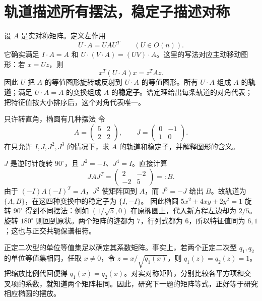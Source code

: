 \section{轨道描述所有摆法，稳定子描述对称}
设 \(A\) 是实对称矩阵。定义左作用
\[
 U\cdot A=UAU^T \qquad (U\in O(n)).
\]
它确实满足 \(I\cdot A=A\) 和 \(U\cdot(V\cdot A)=(UV)\cdot A\)。这里的写法对应主动移动图形：若 \(x=Uz\)，则
\[
 x^T(U\cdot A)x=z^TAz.
\]
因此 \(U\) 把 \(A\) 的等值图形旋转或反射到 \(U\cdot A\) 的等值图形。所有 \(U\cdot A\) 组成 \(A\) 的\textbf{轨道}；满足 \(U\cdot A=A\) 的变换组成 \(A\) 的\textbf{稳定子}。谱定理给出每条轨道的对角代表；把特征值按大小排序后，这个对角代表唯一。

\begin{example}{只许转直角，椭圆有几种摆法}
令
\[
 A=\begin{pmatrix}5&2\\2&2\end{pmatrix},\qquad
 J=\begin{pmatrix}0&-1\\1&0\end{pmatrix}.
\]
在只允许 \(I,J,J^2,J^3\) 的情况下，求 \(A\) 的轨道和稳定子，并解释图形的含义。
\end{example}
\begin{solution}
\(J\) 是逆时针旋转 \(90^\circ\)，且 \(J^2=-I\)、\(J^4=I\)。直接计算
\[
 JAJ^T=\begin{pmatrix}2&-2\\-2&5\end{pmatrix}=:B.
\]
由于 \((-I)A(-I)^T=A\)，\(J^2\) 使矩阵回到 \(A\)，而 \(J^3=-J\) 给出 \(B\)。故轨道为 \(\{A,B\}\)，在这四种变换中的稳定子为 \(\{I,-I\}\)。
因此椭圆 \(5x^2+4xy+2y^2=1\) 旋转 \(90^\circ\) 得到不同摆法：例如 \((1/\sqrt5,0)\) 在原椭圆上，代入新方程左边却为 \(2/5\)。旋转 \(180^\circ\) 则回到原状。两个矩阵的迹都为 \(7\)，行列式都为 \(6\)，所以特征值同为 \(6,1\)；这也与正交共轭保谱相符。
\end{solution}

正定二次型的单位等值集足以确定其系数矩阵。事实上，若两个正定二次型 \(q_1,q_2\) 的单位等值集相同，任取 \(x\ne0\)，令 \(z=x/\sqrt{q_1(x)}\)，则 \(q_1(z)=q_2(z)=1\)。把缩放比例代回便得 \(q_1(x)=q_2(x)\)。对实对称矩阵，分别比较各平方项和交叉项的系数，就知道两个矩阵相同。因此，研究下一题的矩阵等式，正好等于研究相应椭圆的摆放。

